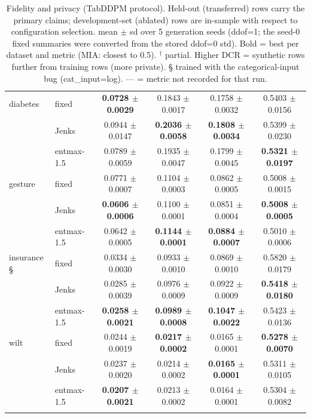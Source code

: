 \begin{table}[t]
\begin{tabular}{llcccc}
diabetes & fixed & \textbf{0.0728 $\pm$ 0.0029} & 0.1843 $\pm$ 0.0017 & 0.1758 $\pm$ 0.0032 & 0.5403 $\pm$ 0.0156 \\
 & Jenks & 0.0944 $\pm$ 0.0147 & \textbf{0.2036 $\pm$ 0.0058} & \textbf{0.1808 $\pm$ 0.0034} & 0.5399 $\pm$ 0.0230 \\
 & entmax-1.5 & 0.0789 $\pm$ 0.0059 & 0.1935 $\pm$ 0.0047 & 0.1799 $\pm$ 0.0045 & \textbf{0.5321 $\pm$ 0.0197} \\
\addlinespace
gesture & fixed & 0.0771 $\pm$ 0.0007 & 0.1104 $\pm$ 0.0003 & 0.0862 $\pm$ 0.0005 & 0.5008 $\pm$ 0.0015 \\
 & Jenks & \textbf{0.0606 $\pm$ 0.0006} & 0.1100 $\pm$ 0.0001 & 0.0851 $\pm$ 0.0004 & \textbf{0.5008 $\pm$ 0.0005} \\
 & entmax-1.5 & 0.0642 $\pm$ 0.0005 & \textbf{0.1144 $\pm$ 0.0001} & \textbf{0.0884 $\pm$ 0.0007} & 0.5010 $\pm$ 0.0006 \\
\addlinespace
insurance § & fixed & 0.0334 $\pm$ 0.0030 & 0.0933 $\pm$ 0.0010 & 0.0869 $\pm$ 0.0010 & 0.5820 $\pm$ 0.0179 \\
 & Jenks & 0.0285 $\pm$ 0.0039 & 0.0976 $\pm$ 0.0009 & 0.0922 $\pm$ 0.0009 & \textbf{0.5418 $\pm$ 0.0180} \\
 & entmax-1.5 & \textbf{0.0258 $\pm$ 0.0021} & \textbf{0.0989 $\pm$ 0.0008} & \textbf{0.1047 $\pm$ 0.0022} & 0.5423 $\pm$ 0.0136 \\
\addlinespace
wilt & fixed & 0.0244 $\pm$ 0.0019 & \textbf{0.0217 $\pm$ 0.0002} & 0.0165 $\pm$ 0.0001 & \textbf{0.5278 $\pm$ 0.0070} \\
 & Jenks & 0.0237 $\pm$ 0.0020 & 0.0214 $\pm$ 0.0002 & \textbf{0.0165 $\pm$ 0.0001} & 0.5311 $\pm$ 0.0105 \\
 & entmax-1.5 & \textbf{0.0207 $\pm$ 0.0021} & 0.0213 $\pm$ 0.0002 & 0.0164 $\pm$ 0.0001 & 0.5304 $\pm$ 0.0082 \\
\addlinespace
\bottomrule
\end{tabular}
\caption{Fidelity and privacy (TabDDPM protocol). Held-out (transferred) rows carry the primary claims; development-set (ablated) rows are in-sample with respect to configuration selection. mean $\pm$ sd over 5 generation seeds (ddof=1; the seed-0 fixed summaries were converted from the stored ddof=0 std). Bold = best per dataset and metric (MIA: closest to 0.5). $^\dagger$ partial. Higher DCR = synthetic rows further from training rows (more private). § trained with the categorical-input bug (cat_input=log). — = metric not recorded for that run.}
\end{table}
